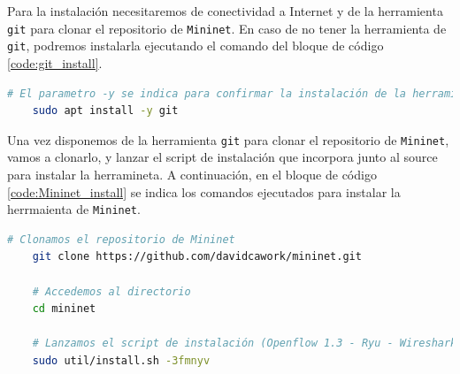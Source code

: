 \begin{table}[ht!]
    \centering
    \caption{Especificaciones máquina de instalación Mininet}
    \label{tab:ToolsMininet}
\end{table}

Para la instalación necesitaremos de conectividad a Internet y de la herramienta \texttt{git} para clonar el repositorio de \texttt{Mininet}. En caso de no tener la herramienta de \texttt{git}, podremos instalarla ejecutando el comando del bloque de código \ref{code:git_install}.

\begin{lstlisting}[language= bash, style=Consola2, caption={Instalación de la herramienta git},label=code:git_install]
    # El parametro -y se indica para confirmar la instalación de la herramienta
    sudo apt install -y git 
\end{lstlisting}
\vspace{1cm}

Una vez disponemos de la herramienta \texttt{git} para clonar el repositorio de \texttt{Mininet}, vamos a clonarlo, y lanzar el script de instalación que incorpora junto al source para instalar la herramineta. A continuación, en el bloque de código \ref{code:Mininet_install} se indica los comandos ejecutados para instalar la herrmaienta de \texttt{Mininet}.


\begin{lstlisting}[language= bash, style=Consola2, caption={Instalación de la herramienta Mininet},label=code:Mininet_install]
    # Clonamos el repositorio de Mininet
    git clone https://github.com/davidcawork/mininet.git

    # Accedemos al directorio
    cd mininet

    # Lanzamos el script de instalación (Openflow 1.3 - Ryu - Wireshark dissector)
    sudo util/install.sh -3fmnyv
\end{lstlisting}
\vspace{1cm}

\newpage
